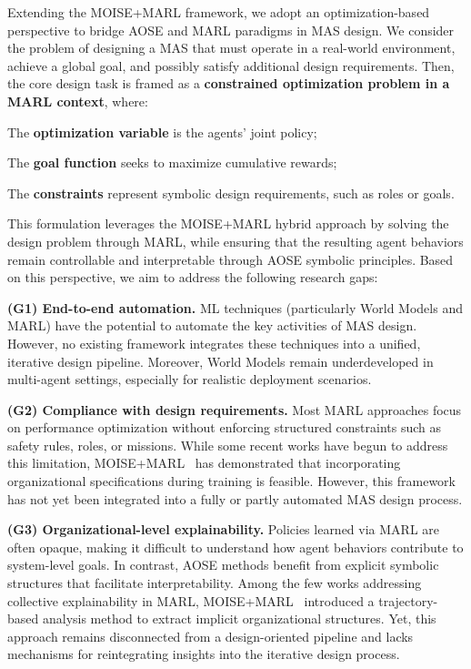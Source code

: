 \documentclass[pdflatex,sn-mathphys-num]{sn-jnl}%
\theoremstyle{thmstyleone}%
\theoremstyle{thmstyletwo}%
\theoremstyle{thmstylethree}%
\begin{document}
Extending the MOISE+MARL framework, we adopt an optimization-based perspective to bridge AOSE and MARL paradigms in MAS design. We consider the problem of designing a MAS that must operate in a real-world environment, achieve a global goal, and possibly satisfy additional design requirements. Then, the core design task is framed as a \textbf{constrained optimization problem in a MARL context}, where:
\begin{enumerate*}[label={\roman*)}, itemjoin={; \quad}]
    \item The \textbf{optimization variable} is the agents' joint policy;
    \item The \textbf{goal function} seeks to maximize cumulative rewards;
    \item The \textbf{constraints} represent symbolic design requirements, such as roles or goals.
\end{enumerate*}

\noindent This formulation leverages the MOISE+MARL hybrid approach by solving the design problem through MARL, while ensuring that the resulting agent behaviors remain controllable and interpretable through AOSE symbolic principles. Based on this perspective, we aim to address the following research gaps:
%
\begin{enumerate*}[label={\roman*)}, itemjoin={; \quad}]
    \item \textbf{(G1) End-to-end automation.} ML techniques (particularly World Models and MARL) have the potential to automate the key activities of MAS design. However, no existing framework integrates these techniques into a unified, iterative design pipeline. Moreover, World Models remain underdeveloped in multi-agent settings, especially for realistic deployment scenarios.
    
    \item \textbf{(G2) Compliance with design requirements.} Most MARL approaches focus on performance optimization without enforcing structured constraints such as safety rules, roles, or missions. While some recent works have begun to address this limitation, MOISE+MARL~\cite{soule2025moisemarl} has demonstrated that incorporating organizational specifications during training is feasible. However, this framework has not yet been integrated into a fully or partly automated MAS design process.
    
    \item \textbf{(G3) Organizational-level explainability.} Policies learned via MARL are often opaque, making it difficult to understand how agent behaviors contribute to system-level goals. In contrast, AOSE methods benefit from explicit symbolic structures that facilitate interpretability. Among the few works addressing collective explainability in MARL, MOISE+MARL~\cite{soule2025moisemarl} introduced a trajectory-based analysis method to extract implicit organizational structures. Yet, this approach remains disconnected from a design-oriented pipeline and lacks mechanisms for reintegrating insights into the iterative design process.
\end{enumerate*}
\end{document}

